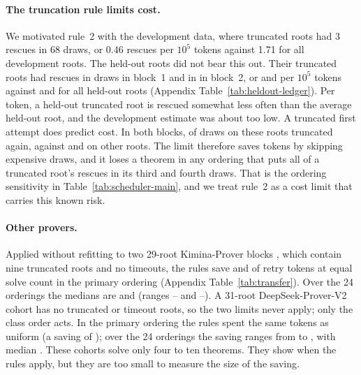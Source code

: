 \paragraph{The truncation rule limits cost.}
We motivated rule~2 with the development data, where truncated roots had 3 rescues in 68 draws, or 0.46 rescues per $10^5$ tokens against 1.71 for all development roots.  The held-out roots did not bear this out.  Their truncated roots had \CrBOneTruncRescues{} rescues in \CrBOneTruncAttempts{} draws in block~1 and \CrBTwoTruncRescues{} in \CrBTwoTruncAttempts{} in block~2, or \CrBOneTruncRho{} and \CrBTwoTruncRho{} per $10^5$ tokens against \CrBOneAllRho{} and \CrBTwoAllRho{} for all held-out roots (Appendix Table~\ref{tab:heldout-ledger}).  Per token, a held-out truncated root is rescued somewhat less often than the average held-out root, and the development estimate was about \CrTruncRhoGap{} too low.  A truncated first attempt does predict cost.  In both blocks, \CrBOneTruncPersist{} of draws on these roots truncated again, against \CrBOneOtherPersist{} and \CrBTwoOtherPersist{} on other roots.  The limit therefore saves tokens by skipping expensive draws, and it loses a theorem in any ordering that puts all of a truncated root's rescues in its third and fourth draws.  That is the ordering sensitivity in Table~\ref{tab:scheduler-main}, and we treat rule~2 as a cost limit that carries this known risk.

\paragraph{Other provers.}
Applied without refitting to two 29-root Kimina-Prover blocks \citep{wang2025kimina}, which contain nine truncated roots and no timeouts, the rules save \SchedKiminaOneSavings{} and \SchedKiminaTwoSavings{} of retry tokens at equal solve count in the primary ordering (Appendix Table~\ref{tab:transfer}).  Over the 24 orderings the medians are \SchedKiminaOneOrdMedian{} and \SchedKiminaTwoOrdMedian{} (ranges \SchedKiminaOneOrdMin{}--\SchedKiminaOneOrdMax{} and \SchedKiminaTwoOrdMin{}--\SchedKiminaTwoOrdMax{}).  A 31-root DeepSeek-Prover-V2 cohort \citep{ren2025deepseekproverv2} has no truncated or timeout roots, so the two limits never apply; only the class order acts.  In the primary ordering the rules spent the same tokens as uniform (a saving of \SchedDeepSeekSavings{}); over the 24 orderings the saving ranges from \SchedDeepSeekOrdMin{} to \SchedDeepSeekOrdMax{}, with median \SchedDeepSeekOrdMedian{}.  These cohorts solve only four to ten theorems.  They show when the rules apply, but they are too small to measure the size of the saving.

